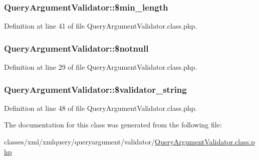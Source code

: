 \subsubsection[{\$min\+\_\+length}]{\setlength{\rightskip}{0pt plus 5cm}Query\+Argument\+Validator\+::\$min\+\_\+length}\label{classQueryArgumentValidator_a5553903c3bdf620408196db924a918c0}


Definition at line 41 of file Query\+Argument\+Validator.\+class.\+php.

\hypertarget{classQueryArgumentValidator_a45e9ab83bacc4f0895f05faa3aeac81c}{}
\subsubsection[{\$notnull}]{\setlength{\rightskip}{0pt plus 5cm}Query\+Argument\+Validator\+::\$notnull}\label{classQueryArgumentValidator_a45e9ab83bacc4f0895f05faa3aeac81c}


Definition at line 29 of file Query\+Argument\+Validator.\+class.\+php.

\hypertarget{classQueryArgumentValidator_aa06a359be9617e979f903ae78537ad79}{}
\subsubsection[{\$validator\+\_\+string}]{\setlength{\rightskip}{0pt plus 5cm}Query\+Argument\+Validator\+::\$validator\+\_\+string}\label{classQueryArgumentValidator_aa06a359be9617e979f903ae78537ad79}


Definition at line 48 of file Query\+Argument\+Validator.\+class.\+php.



The documentation for this class was generated from the following file\+:\begin{DoxyCompactItemize}
\item 
classes/xml/xmlquery/queryargument/validator/\hyperlink{QueryArgumentValidator_8class_8php}{Query\+Argument\+Validator.\+class.\+php}\end{DoxyCompactItemize}
